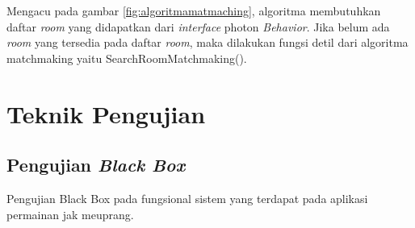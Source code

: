 Mengacu pada gambar \ref{fig:algoritmamatmaching}, algoritma membutuhkan daftar \textit{room} yang didapatkan dari \textit{interface} photon \textit{Behavior}. Jika belum ada \textit{room} yang tersedia pada daftar \textit{room}, maka dilakukan fungsi detil dari algoritma matchmaking yaitu SearchRoomMatchmaking(). 

    
    
    

        \section{Teknik Pengujian}
\subsection{Pengujian \textit{Black Box}}
Pengujian Black Box pada fungsional sistem yang terdapat pada aplikasi permainan jak meuprang.

